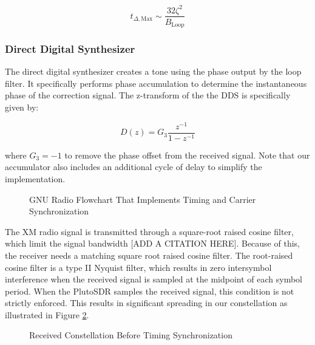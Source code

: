 \documentclass[conference,onecolumn]{IEEEtran}
\begin{document}
\begin{equation}
	t_{\Delta,\text{Max}} \sim \frac{32\zeta^2}{B_\text{Loop}}\end{equation}

\subsubsection{Direct Digital Synthesizer}

The direct digital synthesizer creates a tone using the phase output by the loop filter. It specifically performs phase accumulation to determine the instantaneous phase of the correction signal. The z-transform of the the DDS is specifically given by:

\begin{equation}
	D(z) = G_3\frac{z^{-1}}{1 - z^{-1}}
\end{equation}

\noindent where $G_3 = -1$ to remove the phase offset from the received signal. Note that our accumulator also includes an additional cycle of delay to simplify the implementation.
 
\begin{figure}[H]
	\centerline{}
	\caption{GNU Radio Flowchart That Implements Timing and Carrier Synchronization}
	\label{fig::timing_carrier_sync}
\end{figure}

The XM radio signal is transmitted through a square-root raised cosine filter, which limit the signal bandwidth [ADD A CITATION HERE]. Because of this, the receiver needs a matching square root raised cosine filter. The root-raised cosine filter is a type II Nyquist filter, which results in zero intersymbol interference when the received signal is sampled at the midpoint of each symbol period. When the PlutoSDR samples the received signal, this condition is not strictly enforced. This results in significant spreading in our constellation as illustrated in Figure \ref{fig::constellation_no_timing_comp}.

\begin{figure}[H]
	\centerline{}
	\caption{Received Constellation Before Timing Synchronization}
	\label{fig::constellation_no_timing_comp}
\end{figure}
\end{document}
